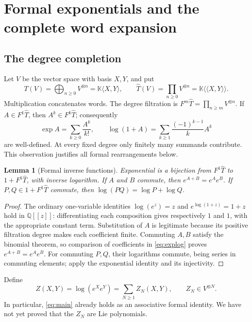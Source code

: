 \documentclass[11pt]{article}
\newtheorem{lemma}[theorem]{Lemma}
\theoremstyle{definition}
\theoremstyle{remark}
\newcommand{\K}{\mathbb K}
\newcommand{\Q}{\mathbb Q}
\numberwithin{equation}{section}
\begin{document}
\section{Formal exponentials and the complete word expansion}\label{sec:formal}
\subsection{The degree completion}
Let $V$ be the vector space with basis $X,Y$, and put
\[
 T(V)=\bigoplus_{n\geq0}V^{\otimes n}=\K\langle X,Y\rangle,
 \qquad
 \widehat T(V)=\prod_{n\geq0}V^{\otimes n}
              =\K\langle\!\langle X,Y\rangle\!\rangle.
\]
Multiplication concatenates words. The degree filtration is
$F^m\widehat T=\prod_{n\geq m}V^{\otimes n}$. If $A\in F^1\widehat T$, then $A^k\in F^k\widehat T$; consequently
\begin{equation}\label{eq:explog}
 \exp A=\sum_{k\geq0}\frac{A^k}{k!},\qquad
 \log(1+A)=\sum_{k\geq1}\frac{(-1)^{k-1}}{k}A^k
\end{equation}
are well-defined. At every fixed degree only finitely many summands contribute. This observation justifies all formal rearrangements below.

\begin{lemma}[Formal inverse functions]\label{lem:explog}
Exponential is a bijection from $F^1\widehat T$ to $1+F^1\widehat T$, with inverse logarithm. If $A$ and $B$ commute, then $e^{A+B}=e^Ae^B$. If $P,Q\in1+F^1\widehat T$ commute, then $\log(PQ)=\log P+\log Q$.
\end{lemma}
\begin{proof}
The ordinary one-variable identities $\log(e^z)=z$ and $e^{\log(1+z)}=1+z$ hold in $\Q[[z]]$: differentiating each composition gives respectively $1$ and $1$, with the appropriate constant term. Substitution of $A$ is legitimate because its positive filtration degree makes each coefficient finite. Commuting $A,B$ satisfy the binomial theorem, so comparison of coefficients in \eqref{eq:explog} proves $e^{A+B}=e^Ae^B$. For commuting $P,Q$, their logarithms commute, being series in commuting elements; apply the exponential identity and its injectivity.
\end{proof}

Define
\begin{equation}\label{eq:Zdefinition}
 Z(X,Y)=\log(e^Xe^Y)=\sum_{N\geq1}Z_N(X,Y),
 \qquad Z_N\in V^{\otimes N}.
\end{equation}
In particular, \eqref{eq:main} already holds as an associative formal identity. We have not yet proved that the $Z_N$ are Lie polynomials.
\end{document}
